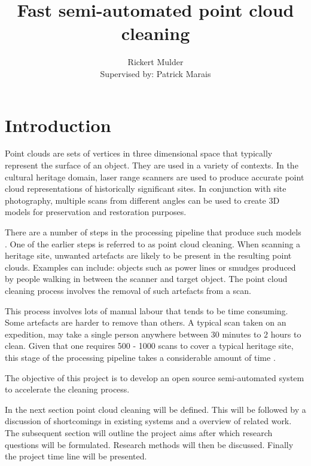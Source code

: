 \documentclass[10pt,twocolumn]{article}
\title{Fast semi-automated point cloud cleaning}
\author{Rickert Mulder\\ Supervised by: Patrick Marais}
\date{}
\begin{document}
\maketitle

\section{Introduction}
Point clouds are sets of vertices in three dimensional space that typically represent the surface of an object. They are used in a variety of contexts. In the cultural heritage domain, laser range scanners are used to produce accurate point cloud representations of historically significant sites. In conjunction with site photography, multiple scans from different angles can be used to create 3D models for preservation and restoration purposes.


There are a number of steps in the processing pipeline that produce such models \cite{Ruther2011}. One of the earlier steps is referred to as point cloud cleaning. When scanning a heritage site, unwanted artefacts are likely to be present in the resulting point clouds. Examples can include: objects such as power lines or smudges produced by people walking in between the scanner and target object. The point cloud cleaning process involves the removal of such artefacts from a scan.

This process involves lots of manual labour that tends to be time consuming. Some artefacts are harder to remove than others. A typical scan taken on an expedition, may take a single person anywhere between 30 minutes to 2 hours to clean. Given that one requires 500 - 1000 scans to cover a typical heritage site, this stage of the processing pipeline takes a considerable amount of time \cite{Ruther2011}.

The objective of this project is to develop an open source semi-automated system to accelerate the cleaning process.

In the next section point cloud cleaning will be defined. This will be followed by a discussion of shortcomings in existing systems and a overview of related work. The subsequent section will outline the project aims after which research questions will be formulated. Research methods will then be discussed. Finally the project time line will be presented.
\end{document}
